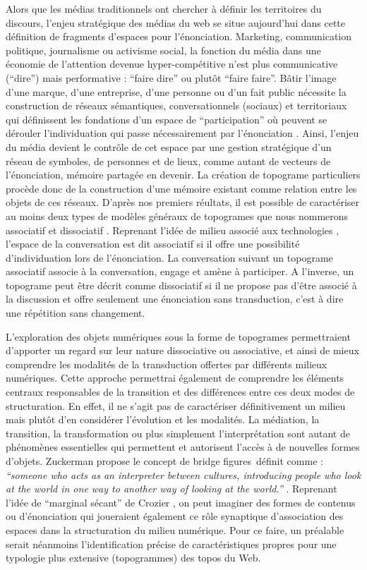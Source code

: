 Alors que les médias traditionnels ont chercher à définir les territoires du discours, l’enjeu stratégique des médias du web se situe aujourd’hui dans cette définition de fragments d’espaces pour l’énonciation. Marketing, communication politique, journalisme ou activisme social, la fonction du média dans une économie de l’attention devenue hyper-compétitive \cite{Weng2012} n’est plus communicative (“dire”) mais performative : “faire dire” ou plutôt “faire faire”. Bâtir l’image d’une marque, d’une entreprise, d’une personne ou d’un fait public nécessite la construction de réseaux sémantiques, conversationnels (sociaux) et territoriaux qui définissent les fondations d’un espace de “participation” où peuvent se dérouler l’individuation qui passe nécessairement par l’énonciation \cite{Butler1993}. Ainsi, l’enjeu du média devient le contrôle de cet espace par une gestion stratégique d’un réseau de symboles, de personnes et de lieux, comme autant de vecteurs de l’énonciation, mémoire partagée en devenir. La création de topograme particuliers procède donc de la construction d’une mémoire existant comme relation entre les objets de ces réseaux. D’après nos premiers réultats, il est possible de caractériser au moins deux types de modèles généraux de topogrames que nous nommerons associatif et dissociatif \cite{Stiegler2008}. Reprenant l’idée de milieu associé aux technologies \cite{Simondon1989}, l’espace de la conversation est dit associatif si il offre une possibilité d’individuation lors de l’énonciation. La conversation suivant un topograme associatif associe à la conversation, engage et amène à participer. A l’inverse, un topograme peut être décrit comme dissociatif si il ne propose pas d’être associé à la discussion et offre seulement une énonciation sans transduction, c’est à dire une répétition sans changement.

L’exploration des objets numériques sous la forme de topogrames permettraient d’apporter un regard sur leur nature dissociative ou associative, et ainsi de mieux comprendre les modalités de la transduction offertes par différents milieux numériques. Cette approche permettrai également de comprendre les éléments centraux responsables de la transition et des différences entre ces deux modes de structuration. En effet, il ne s’agit pas de caractériser définitivement un milieu mais plutôt d’en considérer l’évolution et les modalités. La médiation, la transition, la transformation ou plus simplement l’interprétation sont autant de phénomènes essentielles qui permettent et autorisent l’accès à de nouvelles formes d’objets. Zuckerman propose le concept de bridge figures définit comme : \textit{``someone who acts as an interpreter between cultures, introducing people who look at the world in one way to another way of looking at the world.''} \citep{Zuckerman2013}. Reprenant l’idée de ``marginal sécant'' de Crozier \citep{Crozier1977}, on peut imaginer des formes de contenus ou d’énonciation qui joueraient également ce rôle synaptique d’association des espaces dans la structuration du milieu numérique. Pour ce faire, un préalable serait néanmoins l’identification précise de caractéristiques propres pour une typologie plus extensive (topogrammes) des topos du Web. 

